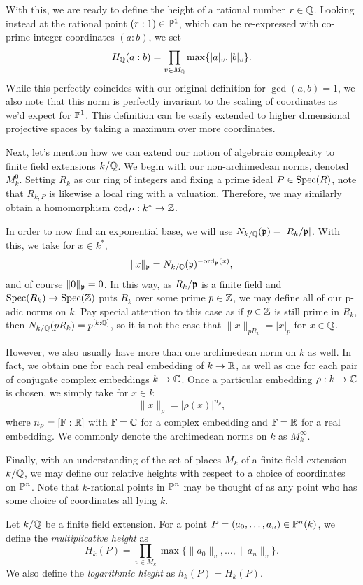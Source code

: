 With this, we are ready to define the height of a rational number $r \in \mathbb{Q}$. 
Looking instead at the rational point $(r : 1) \in \mathbb{P}^1$, 
which can be re-expressed with co-prime integer coordinates $(a : b)$,
we set 
\[
    H_{\mathbb{Q}}(a : b) = \prod_{v \in M_{\mathbb{Q}}} \max\{|a|_v, |b|_v\}.
\]
While this perfectly coincides with our original definition for $\gcd(a, b) = 1$,
we also note that this norm is perfectly invariant to the scaling of coordinates as we'd expect for $\mathbb{P}^1$.
This definition can be easily extended to higher dimensional projective spaces by taking a maximum over more coordinates.

Next, let's mention how we can extend our notion of algebraic complexity to finite field extensions $k/\mathbb{Q}$.
We begin with our non-archimedean norms, denoted $M_k^0$.
Setting $R_k$ as our ring of integers and fixing a prime ideal $P \in {\rm Spec}(R)$, 
note that $R_{k,P}$ is likewise a local ring with a valuation.
Therefore, we may similarly obtain a homomorphism ${\rm ord}_P : k^* \to \mathbb{Z}$.

In order to now find an exponential base,
we will use $N_{k/\mathbb{Q}}(\mathfrak{p}) = |R_k / \mathfrak{p}|$.
With this, we take for $x \in k^*$,
\[
    \|x\|_{\mathfrak{p}} = N_{k / \mathbb{Q}}(\mathfrak{p})^{-{\rm ord}_{\mathfrak{p}}(x)},
\]
and of course $\|0\|_{\mathfrak{p}} = 0$.
In this way, as $R_k / \mathfrak{p}$ is a finite field and ${\rm Spec}(R_k) \to {\rm Spec}(\mathbb{Z})$ puts $R_k$ over some prime $p \in \mathbb{Z}$,
we may define all of our p-adic norms on $k$. 
Pay special attention to this case as if $p \in \mathbb{Z}$ is still prime in $R_k$,
then $N_{k / \mathbb{Q}}(pR_k) = p^{[k : \mathbb{Q}]}$,
so it is not the case that $\|x\|_{p R_k} = |x|_p$ for $x \in \mathbb{Q}$.

However, we also usually have more than one archimedean norm on $k$ as well.
In fact, we obtain one for each real embedding of $k \to \mathbb{R}$,
as well as one for each pair of conjugate complex embeddings $k \to \mathbb{C}$.
Once a particular embedding $\rho : k \to \mathbb{C}$ is chosen,
we simply take for $x \in k$
\[
    \|x\|_\rho = |\rho(x)|^{n_\rho},
\]
where $n_{\rho} = [\mathbb{F} : \mathbb{R}]$ with $\mathbb{F} = \mathbb{C}$ for a complex embedding and $\mathbb{F} = \mathbb{R}$ for a real embedding.
We commonly denote the archimedean norms on $k$ as $M^\infty_k$.

Finally, with an understanding of the set of places $M_k$ of a finite field extension $k/\mathbb{Q}$,
we may define our relative heights with respect to a choice of coordinates on $\mathbb{P}^n$.
Note that $k$-rational points in $\mathbb{P}^n$ may be thought of as any point who has some choice of coordinates all lying $k$. 

\begin{definition}
    Let $k/\mathbb{Q}$ be a finite field extension.
    For a point $P = (a_0, \ldots, a_n) \in \mathbb{P}^n(k)$,
    we define the \textit{multiplicative height} as
    \[
        H_k(P) = \prod_{v \in M_k} \max\{\|a_0\|_v, \ldots, \|a_n\|_v\}.
    \]
    We also define the \textit{logarithmic hieght} as $h_k(P) = H_k(P)$.
\end{definition}

